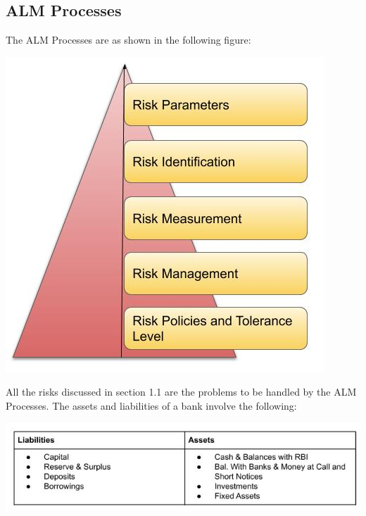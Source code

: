 	\subsection{ALM Processes}
		The ALM Processes are as shown in the following figure:
		
		\begin{center}
		\includegraphics[width=\linewidth]{figures/ALM_Process.jpg}	
		\label{fig:ALM Processes}
		\end{center}
		

		All the risks discussed in section 1.1 are the problems to be handled by the ALM Processes. The assets and liabilities of a bank involve the following:

		\begin{center}
		\includegraphics[width=\linewidth]{figures/Components_of_Banks_Balance_Sheet.jpg}	
		\label{fig:Components of Banks Balance Sheet}
		\end{center}
	
